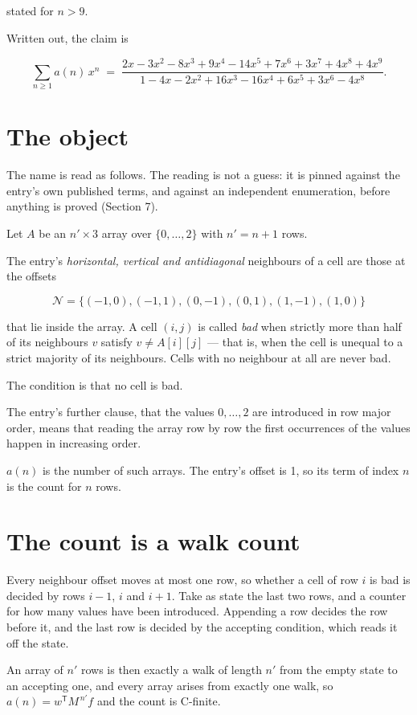 \documentclass[11pt]{article}
\theoremstyle{definition}
\begin{document}
stated for $n > 9$.

Written out, the claim is

\[\sum_{n \ge 1} a(n)\,x^n \;=\; \frac{2x - 3x^{2} - 8x^{3} + 9x^{4} - 14x^{5} + 7x^{6} + 3x^{7} + 4x^{8} + 4x^{9}}{1 - 4x - 2x^{2} + 16x^{3} - 16x^{4} + 6x^{5} + 3x^{6} - 4x^{8}}.\]

\section{The object}

The name is read as follows. The reading is not a guess: it is pinned against the entry's own published terms, and against an independent enumeration, before anything is proved (Section 7).

Let $A$ be an $n' \times 3$ array over $\{0,\dots,2\}$ with $n' = n + 1$ rows.

The entry's {\itshape horizontal, vertical and antidiagonal} neighbours of a cell are those at the offsets

\[\mathcal{N} = \{(-1,0), (-1,1), (0,-1), (0,1), (1,-1), (1,0)\}\]

that lie inside the array. A cell $(i,j)$ is called {\itshape bad} when strictly more than half of its neighbours $v$ satisfy $v \ne A[i][j]$ --- that is, when the cell is unequal to a strict majority of its neighbours. Cells with no neighbour at all are never bad.

The condition is that no cell is bad.

The entry's further clause, that the values $0,\dots,2$ are introduced in row major order, means that reading the array row by row the first occurrences of the values happen in increasing order.

$a(n)$ is the number of such arrays. The entry's offset is 1, so its term of index $n$ is the count for $n$ rows.

\section{The count is a walk count}

Every neighbour offset moves at most one row, so whether a cell of row $i$ is bad is decided by rows $i-1$, $i$ and $i+1$. Take as state the last two rows, and a counter for how many values have been introduced. Appending a row decides the row before it, and the last row is decided by the accepting condition, which reads it off the state.

An array of $n'$ rows is then exactly a walk of length $n'$ from the empty state to an accepting one, and every array arises from exactly one walk, so $a(n) = w^{\mathsf T}M^{\,n'}f$ and the count is C-finite.
\end{document}
